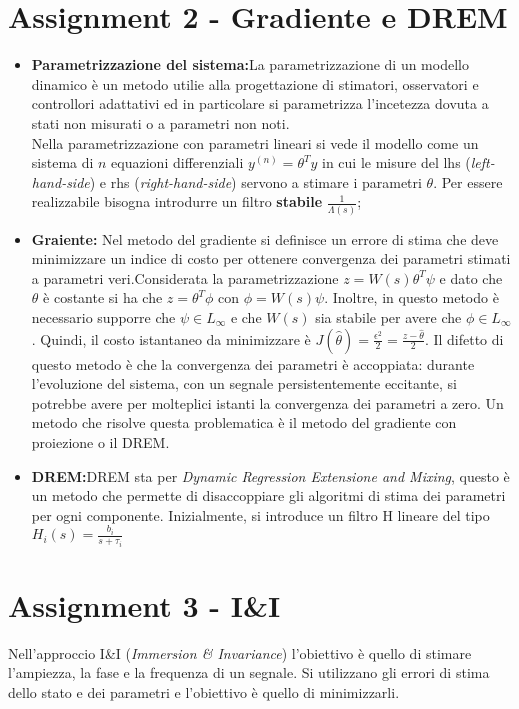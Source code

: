 \documentclass{article}
\begin{document}
\section{Assignment 2 - Gradiente e DREM}%
\begin{itemize}
    \item \textbf{Parametrizzazione del sistema:}La parametrizzazione di un modello dinamico è un metodo utilie alla progettazione di stimatori, osservatori e controllori adattativi ed in particolare si parametrizza l'incetezza dovuta a stati non misurati o a parametri non noti.\\ Nella parametrizzazione con parametri lineari si vede il modello come un sistema di \(n\) equazioni differenziali \(y^{(n)}=\theta^{T}y\) in cui le misure del lhs (\emph{left-hand-side}) e rhs (\emph{right-hand-side}) servono a stimare i parametri \(\theta \). Per essere realizzabile bisogna introdurre un filtro \textbf{stabile} \(\frac{1}{\Lambda{(s)}}\);
    \item \textbf{Graiente:} Nel metodo del gradiente si definisce un errore di stima che deve minimizzare un indice di costo per ottenere convergenza dei parametri stimati a parametri veri.\newline Considerata la parametrizzazione \(z=W(s)\theta^{T}\psi \) e dato che \(\theta \) è costante si ha che \(z=\theta^{T}\phi \) con \(\phi=W(s)\psi \). Inoltre, in questo metodo è necessario supporre che \(\psi\in L_{\infty }\) e che \(W(s)\) sia stabile per avere che \(\phi\in L_{\infty}\).%
    Quindi, il costo istantaneo da minimizzare è \(J(\hat{\theta })=\frac{\epsilon^{2}}{2}=\frac{z-\hat{\theta }}{2}\).%
     Il difetto di questo metodo è che la convergenza dei parametri è accoppiata: durante l'evoluzione del sistema, con un segnale persistentemente eccitante, si potrebbe avere per molteplici istanti la convergenza dei parametri a zero. Un metodo che risolve questa problematica è il metodo del gradiente con proiezione o il DREM.%
    \item \textbf{DREM:}DREM sta per \emph{Dynamic Regression Extensione and Mixing}, questo è un metodo che permette di disaccoppiare gli algoritmi di stima dei parametri per ogni componente. Inizialmente, si introduce un filtro H lineare del tipo \(H_{i}(s)=\frac{b_{i}}{s+\tau_{i}}\)
\end{itemize}

\section{Assignment 3 - I\&I}%
Nell'approccio I\&I (\emph{Immersion \& Invariance}) l'obiettivo è quello di stimare l'ampiezza, la fase e la frequenza di un segnale. Si utilizzano gli errori di stima dello stato e dei parametri e l'obiettivo è quello di minimizzarli.
\end{document}
